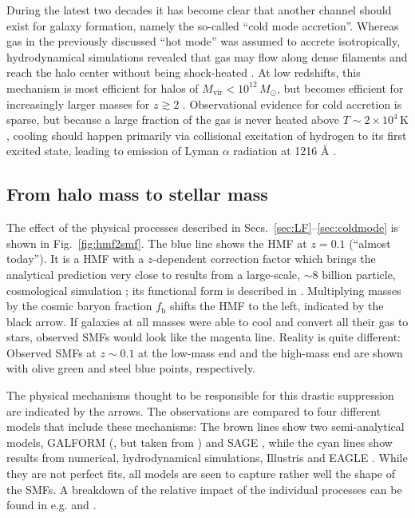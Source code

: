 \documentclass[useAMS]{aa}
\begin{document}
During the latest two decades it has become clear that another channel should exist for galaxy formation, namely the so-called ``cold mode accretion''.
Whereas gas in the previously discussed ``hot mode'' was assumed to accrete isotropically, hydrodynamical simulations revealed that gas may flow along dense filaments and reach the halo center without being shock-heated \citep{Birnboim2003}.
At low redshifts, this mechanism is most efficient for halos of $M_\mathrm{vir}<10^{12}\,M_\odot$, but becomes efficient for increasingly larger masses for $z\gtrsim2$ \citep{Dekel2006}.
Observational evidence for cold accretion is sparse, but because a large fraction of the gas is never heated above $T\sim2\times10^4\,\mathrm{K}$ \citep[e.g.][]{Keres2005}, cooling should happen primarily via collisional excitation of hydrogen to its first excited state, leading to emission of Lyman $\alpha$ radiation at 1216 {\AA} \citep[see e.g.][for recent observational evidence]{Daddi2021,Daddi2022}.

\subsection{From halo mass to stellar mass}
\label{sec:hmf2smf}

The effect of the physical processes described in Secs.~\ref{sec:LF}--\ref{sec:coldmode} is shown in Fig.~\ref{fig:hmf2smf}.
The blue line shows the HMF at $z=0.1$ (``almost today'').
It is a \citet{Sheth2002} HMF with a $z$-dependent correction factor which brings the analytical prediction very close to results from a large-scale, $\sim8$ billion particle, cosmological simulation \citep{Klypin2011};
its functional form is described in \citet{Laursen2019}.
Multiplying masses by the cosmic baryon fraction $f_\mathrm{b}$ shifts the HMF to the left, indicated by the black arrow.
If galaxies at all masses were able to cool and convert all their gas to stars, observed SMFs would look like the magenta line.
Reality is quite different: Observed SMFs at $z\sim0.1$ at the low-mass end \citep{Wright2017} and the high-mass end \citep{Bernardi2013} are shown with olive green and steel blue points, respectively.

The physical mechanisms thought to be responsible for this drastic suppression are indicated by the arrows.
The observations are compared to four different models that include these mechanisms: 
The brown lines show two semi-analytical models, GALFORM (\citealt{Gonzalez-Perez2014}, but taken from \citealt{Somerville2015}) and SAGE \citep{Croton2016}, while the cyan lines show results from numerical, hydrodynamical simulations, Illustris \citep{Vogelsberger2014} and EAGLE \citep{Schaye2015}.
While they are not perfect fits, all models are seen to capture rather well the shape of the SMFs.
A breakdown of the relative impact of the individual processes can be found in e.g. \citet{Benson2003} and \citet{Bower2012}.
\end{document}
